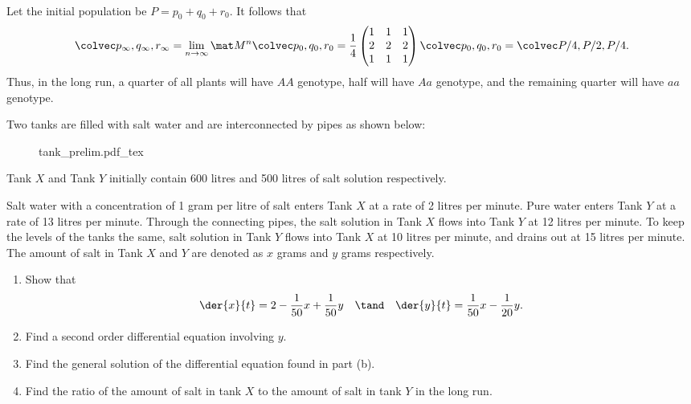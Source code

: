 \begin{solution}
\begin{ppart}
\begin{align*}
        \end{align*}
        Let the initial population be $P = p_0 + q_0 + r_0$. It follows that \[\cveciii{p_\infty}{q_\infty}{r_\infty} = \lim_{n \to \infty} \mat M^n \cveciii{p_0}{q_0}{r_0} = \frac14 \begin{pmatrix}1 & 1 & 1 \\ 2 & 2 & 2 \\ 1 & 1 & 1\end{pmatrix} \cveciii{p_0}{q_0}{r_0} = \cveciii{P/4}{P/2}{P/4}.\] Thus, in the long run, a quarter of all plants will have $AA$ genotype, half will have $Aa$ genotype, and the remaining quarter will have $aa$ genotype.
    \end{ppart}
\end{solution}

\begin{problem}
    Two tanks are filled with salt water and are interconnected by pipes as shown below:

    \begin{figure}[H]
        \centering
        {tank_prelim.pdf_tex}
    \end{figure}

    Tank $X$ and Tank $Y$ initially contain 600 litres and 500 litres of salt solution respectively.

    Salt water with a concentration of 1 gram per litre of salt enters Tank $X$ at a rate of 2 litres per minute. Pure water enters Tank $Y$ at a rate of 13 litres per minute. Through the connecting pipes, the salt solution in Tank $X$ flows into Tank $Y$ at 12 litres per minute. To keep the levels of the tanks the same, salt solution in Tank $Y$ flows into Tank $X$ at 10 litres per minute, and drains out at 15 litres per minute. The amount of salt in Tank $X$ and $Y$ are denoted as $x$ grams and $y$ grams respectively.

    \begin{enumerate}
        \item Show that \[\der{x}{t} = 2 - \frac1{50} x + \frac1{50} y \quad \tand \quad \der{y}{t} = \frac1{50} x - \frac1{20} y.\]
        \item Find a second order differential equation involving $y$.
        \item Find the general solution of the differential equation found in part (b).
        \item Find the ratio of the amount of salt in tank $X$ to the amount of salt in tank $Y$ in the long run.
    \end{enumerate}
\end{problem}
